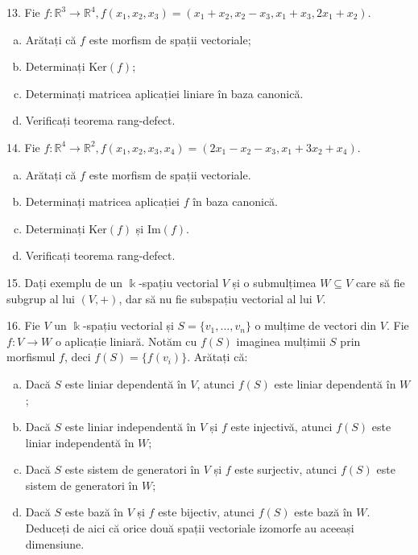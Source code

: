 \documentclass[11pt,a4paper]{article}
\newcommand\seq{\subseteq}
\newcommand\RR{\mathbb{R}}
\newcommand\Ker{\mathrm{Ker}}
\newcommand\Img{\mathrm{Im}}
\theoremstyle{dotless}
\theoremstyle{dotlessdr}
\begin{document}
13. Fie $f : \RR^3 \to \RR^4, f(x_1, x_2, x_3) = (x_1 + x_2, x_2 - x_3, x_1 + x_3, 2x_1 + x_2)$.
\begin{enumerate}[(a)]
\item Arătați că $f$ este morfism de spații vectoriale;
\item Determinați $\Ker(f)$;
\item Determinați matricea aplicației liniare în baza canonică.
\item Verificați teorema rang-defect.
\end{enumerate}

\vspace{1cm}

14. Fie $f : \RR^4 \to \RR^2, f(x_1, x_2, x_3, x_4) = (2x_1 - x_2 - x_3, x_1 + 3x_2 + x_4)$.
\begin{enumerate}[(a)]
\item Arătați că $f$ este morfism de spații vectoriale.
\item Determinați matricea aplicației $f$ în baza canonică.
\item Determinați $\Ker(f)$ și $\Img(f)$.
\item Verificați teorema rang-defect.
\end{enumerate}

\vspace{1cm}

15. Dați exemplu de un $\Bbbk$-spațiu vectorial $V$ și o submulțimea $W \seq V$
care să fie subgrup al lui $(V, +)$, dar să nu fie subspațiu vectorial al lui $V$.

\vspace{1cm}

16. Fie $V$ un $\Bbbk$-spațiu vectorial și $S = \{v_1, \dots, v_n\}$ o mulțime
de vectori din $V$. Fie $f : V \to W$ o aplicație liniară. Notăm cu $f(S)$
imaginea mulțimii $S$ prin morfismul $f$, deci $f(S) = \{ f(v_i) \}$.
Arătați că:
\begin{enumerate}[(a)]
\item Dacă $S$ este liniar dependentă în $V$, atunci $f(S)$ este liniar dependentă
  în $W$;
\item Dacă $S$ este liniar independentă în $V$ și $f$ este injectivă, atunci
  $f(S)$ este liniar independentă în $W$;
\item Dacă $S$ este sistem de generatori în $V$ și $f$ este surjectiv, atunci
  $f(S)$ este sistem de generatori în $W$;
\item Dacă $S$ este bază în $V$ și $f$ este bijectiv, atunci $f(S)$ este
  bază în $W$. Deduceți de aici că orice două spații vectoriale izomorfe
  au aceeași dimensiune.
\end{enumerate}
\end{document}
